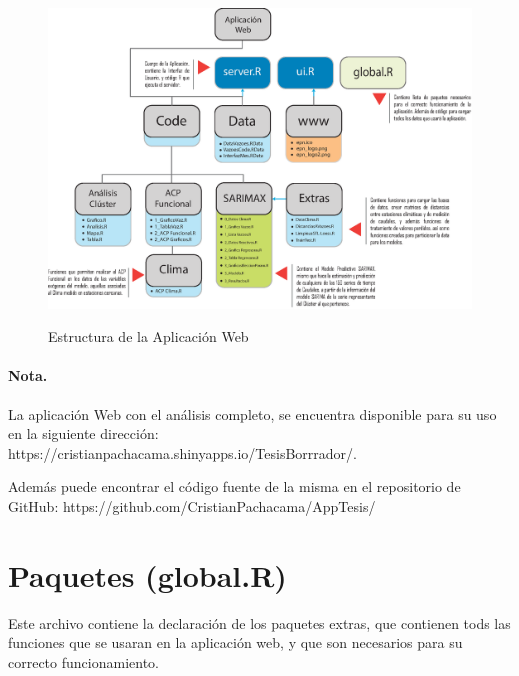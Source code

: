 \documentclass[12pt,oneside]{book}\usepackage[]{graphicx}\usepackage[]{color}
\theoremstyle{definition} %
\begin{document}
\begin{figure}[h]
\caption{Estructura de la Aplicación Web}
\includegraphics[width=15cm]{MapaApp.eps}
\label{fig:mapa_webapp}
\centering
\end{figure}

\paragraph{Nota. } La aplicación Web con el análisis completo, se encuentra disponible para su uso en la siguiente dirección:
{\color{blue} https://cristianpachacama.shinyapps.io/TesisBorrrador/}.

Además puede encontrar el código fuente de la misma en el repositorio de GitHub:
{\color{blue} https://github.com/CristianPachacama/AppTesis/}


\section{Paquetes (global.R)}

Este archivo contiene la declaración de los paquetes extras, que contienen tods las funciones que se usaran en la aplicación web, y que son necesarios para su correcto funcionamiento.
\end{document}
